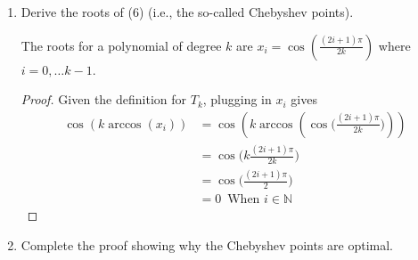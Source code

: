 \documentclass{article}
\begin{document}
\begin{enumerate}
\begin{enumerate}
\begin{proof}
                    For $k = 2t+1$ odd,
                    \begin{align*}
                        \mathcal L \mathcal C (T_k) &= \mathcal L \mathcal C (T_{k-1}) + \mathcal L \mathcal C (T_t) \mathcal L \mathcal C (T_{t+1}) \text{ From the other recurrence in (a)} \\
                        &= 2^{k-2} + (2^{t-1})(2^t) \text{ From IH} \\
                        &= 2^{k-2} + 2^{2t-1}\\
                        &= 2^{k-2} + 2^{k-2} = 2^{k-1}\\
                    \end{align*}

                \end{proof} 
            \item Derive the roots of (6) (i.e., the so-called Chebyshev points).
                
                The roots for a polynomial of degree $k$ are $x_i = \cos(\frac{(2i+1)\pi}{2k})$ where $i = 0,\dots k-1$.
                \begin{proof}
                    Given the definition for $T_k$, plugging in $x_i$ gives
                    \begin{align*}
                        \cos(k\arccos(x_i)) &= \cos(k\arccos (\cos\Big(\frac{(2i+1)\pi}{2k}\Big))) \\
                        &= \cos\Big(k\frac{(2i+1)\pi}{2k}\Big) \\
                        &= \cos\Big(\frac{(2i+1)\pi}{2}\Big) \\
                        &= 0 \, \text{ When }i \in \mathbb{N}
                    \end{align*} 
                \end{proof}  
            \item Complete the proof showing why the Chebyshev points are optimal.


\end{enumerate}
\end{enumerate}
\end{document}
